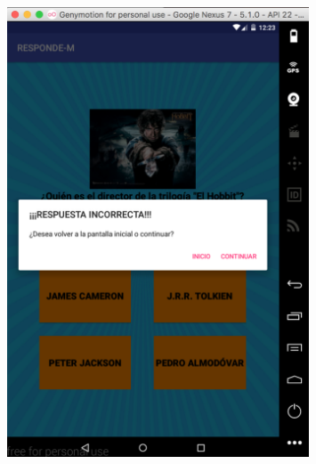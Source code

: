\documentclass[10pt]{article}
\begin{document}
\begin{figure}[H]
	\begin{center}
 		\includegraphics[width = 0.8\textwidth]{Imagenes/captura3.eps}
	\end{center} 
\end{figure}
\end{document}
